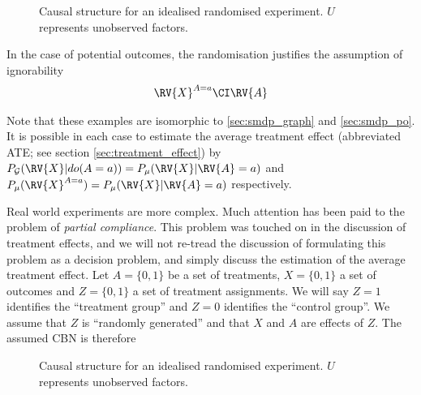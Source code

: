 \begin{figure}[h]
    \centering

    \caption{Causal structure for an idealised randomised experiment. $U$ represents unobserved factors.}
    \label{fig:rand_expt}
\end{figure}

In the case of potential outcomes, the randomisation justifies the assumption of ignorability
\begin{align}
    \RV{X}^{A=a} \CI \RV{A}
\end{align}

Note that these examples are isomorphic to \ref{sec:smdp_graph} and \ref{sec:smdp_po}. It is possible in each case to estimate the average treatment effect (abbreviated ATE; see section \ref{sec:treatment_effect}) by $P_{\mathcal{G}}(\RV{X}|do(A=a))=P_\mu(\RV{X}|\RV{A}=a)$ and $P_\mu(\RV{X}^{A=a})=P_\mu(\RV{X}|\RV{A}=a)$ respectively.

Real world experiments are more complex. Much attention has been paid to the problem of \emph{partial compliance}. This problem was touched on in the discussion of treatment effects, and we will not re-tread the discussion of formulating this problem as a decision problem, and simply discuss the estimation of the average treatment effect. Let $A=\{0,1\}$ be a set of treatments, $X=\{0,1\}$ a set of outcomes and $Z=\{0,1\}$ a set of treatment assignments. We will say $Z=1$ identifies the ``treatment group'' and $Z=0$ identifies the ``control group''. We assume that $Z$ is ``randomly generated'' and that $X$ and $A$ are effects of $Z$. The assumed CBN is therefore

\begin{figure}[h]
    \centering

    \caption{Causal structure for an idealised randomised experiment. $U$ represents unobserved factors.}
    \label{fig:rand_expt_imp}
\end{figure}

